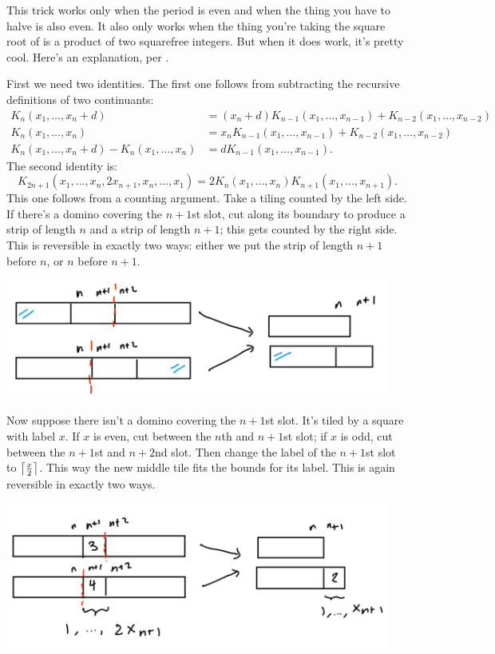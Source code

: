 \documentclass[11pt,paper=letter]{scrartcl}
\begin{document}
This trick works only when the period is even and when the thing you have to halve is also even. It also only works when the thing you're taking the square root of is a product of two squarefree integers. But when it does work, it's pretty cool. Here's an explanation, per \cite{spier}.

First we need two identities. The first one follows from subtracting the recursive definitions of two continuants:
\begin{align*}
K_n(x_1, \ldots, x_n + d) &=
(x_n + d)K_{n-1}(x_1, \ldots, x_{n-1})
+ K_{n-2}(x_1, \ldots, x_{n-2}) \\
K_n(x_1, \ldots, x_n) &=
x_n K_{n-1}(x_1, \ldots, x_{n-1})
+ K_{n-2}(x_1, \ldots, x_{n-2}) \\
K_n(x_1, \ldots, x_n + d) - K_n(x_1, \ldots, x_n)
&= d K_{n-1}(x_1, \ldots, x_{n-1}).
\end{align*}
The second identity is: \[
K_{2n+1}(x_1, \ldots, x_n, 2x_{n+1}, x_n, \ldots, x_1)
= 2K_n(x_1, \ldots, x_n)K_{n+1}(x_1, \ldots, x_{n+1}).\]
This one follows from a counting argument. Take a tiling counted by the left side. If there's a domino covering the $n+1$st slot, cut along its boundary to produce a strip of length $n$ and a strip of length $n+1$; this gets counted by the right side. This is reversible in exactly two ways: either we put the strip of length $n+1$ before $n$, or $n$ before $n+1$.

\begin{center}
\includegraphics[width=5in]{8.png}
\end{center}

Now suppose there isn't a domino covering the $n+1$st slot. It's tiled by a square with label $x$. If $x$ is even, cut between the $n$th and $n+1$st slot; if $x$ is odd, cut between the $n+1$st and $n+2$nd slot. Then change the label of the $n+1$st slot to $\left\lceil \frac{x}{2} \right\rceil$. This way the new middle tile fits the bounds for its label. This is again reversible in exactly two ways.

\begin{center}
\includegraphics[width=5in]{9.png}
\end{center}
\end{document}
